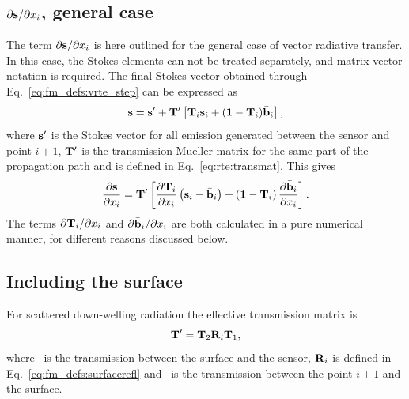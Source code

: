 \subsection{$\partial{\bf s}/\partial x_{i}$, general 
case}
\label{sec:wfuns:atmvars:gene}
%
The term $\partial{\bf s}/\partial x_{i}$ is here outlined for the general case
of vector radiative transfer. In this case, the Stokes elements can not be
treated separately, and matrix-vector notation is required. The final Stokes
vector obtained through Eq.~\ref{eq:fm_defs:vrte_step} can be expressed as
\begin{equation}
  \label{eq:s4J}
  {\bf s} = {\bf s}' + \mathbf{T}' \left[ \mathbf{T}_{i} {\bf s}_{i} +
         (\mathbf{1}-\mathbf{T}_{i})\bar{{\bf b}}_i \right],
\end{equation}
where ${\bf s}'$ is the Stokes vector for all emission generated between the
sensor and point $i+1$, $\mathbf{T}'$ is the transmission Mueller matrix for the
same part of the propagation path and  is defined in
Eq.~\ref{eq:rte:transmat}. This gives
\begin{equation}
  \frac{\partial{\bf s}}{\partial x_{i}} = \mathbf{T}'
  \left[
    \frac{\partial\mathbf{T}_{i}}{\partial x_{i}}
      \left( {\bf s}_{i}-\bar{{\bf b}}_i \right) +
    \left( \mathbf{1}-\mathbf{T}_{i} \right) 
      \frac{\partial\bar{{\bf b}}_i}{\partial x_{i}}
  \right].
  \label{eq:wfuns:dsdxi1}
\end{equation}
The terms $\partial\mathbf{T}_{i}/\partial x_{i}$ and
$\partial\bar{{\bf b}}_i/\partial x_{i}$ are both calculated in a pure
numerical manner, for different reasons discussed below.


\subsection{Including the surface}
%
For scattered down-welling radiation the effective transmission matrix is
\begin{equation}
  \mathbf{T}' = \mathbf{T}_{2}\mathbf{R}_i\mathbf{T}_{1},
  \label{eq:wfuns:surface}
\end{equation}
where \ is the transmission between the surface and the sensor,
$\mathbf{R}_i$ is defined in Eq.~\ref{eq:fm_defs:surfacerefl} and
\ is the transmission between the point $i+1$ and the surface.



